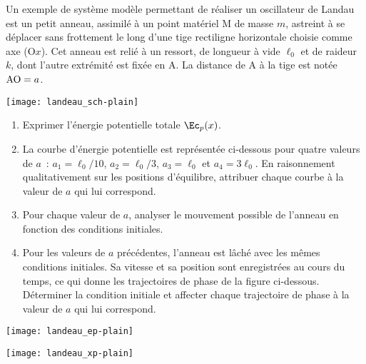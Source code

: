 \documentclass[a4paper, 12pt, final, garamond]{book}
\begin{document}
\begin{minipage}{0.70\linewidth}
    Un exemple de système modèle permettant de réaliser un oscillateur de Landau
    est un petit anneau, assimilé à un point matériel M de masse $m$, astreint à
    se déplacer sans frottement le long d'une tige rectiligne horizontale
    choisie comme axe (O$x$). Cet anneau est relié à un ressort, de longueur à
    vide $\ell_0$ et de raideur $k$, dont l'autre extrémité est fixée en A. La
    distance de A à la tige est notée ${\rm AO} = a$.
\end{minipage}
\hfill
\begin{minipage}{0.25\linewidth}
    \begin{center}
        \texttt{[image: landeau\_sch-plain]}
    \end{center}
\end{minipage} \bigbreak

\begin{enumerate}
    \item Exprimer l'énergie potentielle totale $\Ec_p(x)$.
    \item La courbe d'énergie potentielle est représentée ci-dessous pour quatre
        valeurs de $a$~: $a_1 = \ell_0/10$, $a_2 = \ell_0/3$, $a_3 = \ell_0$ et
        $a_4 = 3\ell_0$. En raisonnement qualitativement sur les positions
        d'équilibre, attribuer chaque courbe à la valeur de $a$ qui lui
        correspond.
    \item Pour chaque valeur de $a$, analyser le mouvement possible de l'anneau
        en fonction des conditions initiales.
    \item Pour les valeurs de $a$ précédentes, l'anneau est lâché avec les mêmes
        conditions initiales. Sa vitesse et sa position sont enregistrées au
        cours du temps, ce qui donne les trajectoires de phase de la figure
        ci-dessous. Déterminer la condition initiale et affecter chaque
        trajectoire de phase à la valeur de $a$ qui lui correspond.
\end{enumerate} \bigbreak

\begin{minipage}{0.45\linewidth}
    \begin{center}
        \texttt{[image: landeau\_ep-plain]}
    \end{center}
\end{minipage}
\hfill
\begin{minipage}{0.45\linewidth}
    \begin{center}
        \texttt{[image: landeau\_xp-plain]}
    \end{center}
\end{minipage}
\end{document}
